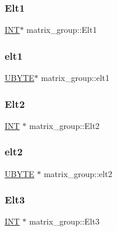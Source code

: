 \subsubsection{\texorpdfstring{Elt1}{Elt1}}
{\footnotesize\ttfamily \mbox{\hyperlink{galois_8h_a09fddde158a3a20bd2dcadb609de11dc}{I\+NT}}$\ast$ matrix\+\_\+group\+::\+Elt1}

\mbox{\label{classmatrix__group_a2134904ce4827cea1ea77b5f2d7bde48}} 
\subsubsection{\texorpdfstring{elt1}{elt1}}
{\footnotesize\ttfamily \mbox{\hyperlink{galois_8h_a122c4acf389c050379f00341fdcd5812}{U\+B\+Y\+TE}}$\ast$ matrix\+\_\+group\+::elt1}

\mbox{\label{classmatrix__group_a69784dc7ac2d2dc3455715fc5dd0a661}} 
\subsubsection{\texorpdfstring{Elt2}{Elt2}}
{\footnotesize\ttfamily \mbox{\hyperlink{galois_8h_a09fddde158a3a20bd2dcadb609de11dc}{I\+NT}} $\ast$ matrix\+\_\+group\+::\+Elt2}

\mbox{\label{classmatrix__group_af8d35a59a84ef6c7151195f7f8e88cfe}} 
\subsubsection{\texorpdfstring{elt2}{elt2}}
{\footnotesize\ttfamily \mbox{\hyperlink{galois_8h_a122c4acf389c050379f00341fdcd5812}{U\+B\+Y\+TE}} $\ast$ matrix\+\_\+group\+::elt2}

\mbox{\label{classmatrix__group_a8687e341110b36e05ba87c4b1361044b}} 
\subsubsection{\texorpdfstring{Elt3}{Elt3}}
{\footnotesize\ttfamily \mbox{\hyperlink{galois_8h_a09fddde158a3a20bd2dcadb609de11dc}{I\+NT}} $\ast$ matrix\+\_\+group\+::\+Elt3}

